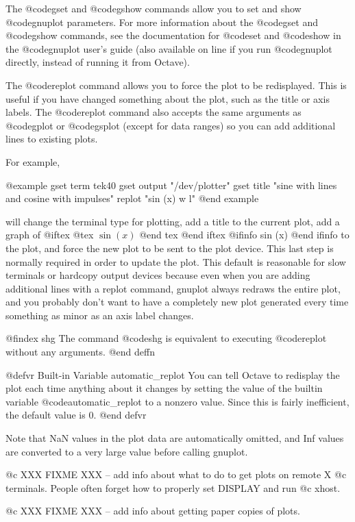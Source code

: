 The @code{gset} and @code{gshow} commands allow you to set and show
@code{gnuplot} parameters.  For more information about the @code{gset}
and @code{gshow} commands, see the documentation for @code{set} and
@code{show} in the @code{gnuplot} user's guide (also available on line
if you run @code{gnuplot} directly, instead of running it from Octave).

The @code{replot} command allows you to force the plot to be
redisplayed.  This is useful if you have changed something about the
plot, such as the title or axis labels.  The @code{replot} command also
accepts the same arguments as @code{gplot} or @code{gsplot} (except for
data ranges) so you can add additional lines to existing plots.  

For example,

@example
gset term tek40
gset output "/dev/plotter"
gset title "sine with lines and cosine with impulses"
replot "sin (x) w l"
@end example

will change the terminal type for plotting, add a title to the current
plot, add a graph of
@iftex
@tex
$\sin(x)$
@end tex
@end iftex
@ifinfo
sin (x) 
@end ifinfo
to the plot, and force the new plot to be
sent to the plot device.  This last step is normally required in order
to update the plot.  This default is reasonable for slow terminals or
hardcopy output devices because even when you are adding additional
lines with a replot command, gnuplot always redraws the entire plot, and
you probably don't want to have a completely new plot generated every
time something as minor as an axis label changes.

@findex shg
The command @code{shg} is equivalent to executing @code{replot} without
any arguments.
@end deffn

@defvr {Built-in Variable} automatic_replot
You can tell Octave to redisplay the plot each time anything about it
changes by setting the value of the builtin variable
@code{automatic_replot} to a nonzero value.  Since this is fairly
inefficient, the default value is 0.
@end defvr

Note that NaN values in the plot data are automatically omitted, and
Inf values are converted to a very large value before calling gnuplot.

@c XXX FIXME XXX -- add info about what to do to get plots on remote X
@c terminals.  People often forget how to properly set DISPLAY and run
@c xhost.

@c XXX FIXME XXX -- add info about getting paper copies of plots.

